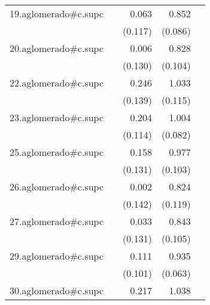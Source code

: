 {\begin{longtable}{l*{4}{D{.}{.}{-1}}}
\addlinespace
19.aglomerado#c.supc&                     &       0.063         &       0.852\sym{***}&                     \\
            &                     &     (0.117)         &     (0.086)         &                     \\
\addlinespace
20.aglomerado#c.supc&                     &       0.006         &       0.828\sym{***}&                     \\
            &                     &     (0.130)         &     (0.104)         &                     \\
\addlinespace
22.aglomerado#c.supc&                     &       0.246         &       1.033\sym{***}&                     \\
            &                     &     (0.139)         &     (0.115)         &                     \\
\addlinespace
23.aglomerado#c.supc&                     &       0.204         &       1.004\sym{***}&                     \\
            &                     &     (0.114)         &     (0.082)         &                     \\
\addlinespace
25.aglomerado#c.supc&                     &       0.158         &       0.977\sym{***}&                     \\
            &                     &     (0.131)         &     (0.103)         &                     \\
\addlinespace
26.aglomerado#c.supc&                     &       0.002         &       0.824\sym{***}&                     \\
            &                     &     (0.142)         &     (0.119)         &                     \\
\addlinespace
27.aglomerado#c.supc&                     &       0.033         &       0.843\sym{***}&                     \\
            &                     &     (0.131)         &     (0.105)         &                     \\
\addlinespace
29.aglomerado#c.supc&                     &       0.111         &       0.935\sym{***}&                     \\
            &                     &     (0.101)         &     (0.063)         &                     \\
\addlinespace
30.aglomerado#c.supc&                     &       0.217         &       1.038\sym{***}&                     \\

\end{longtable}}
